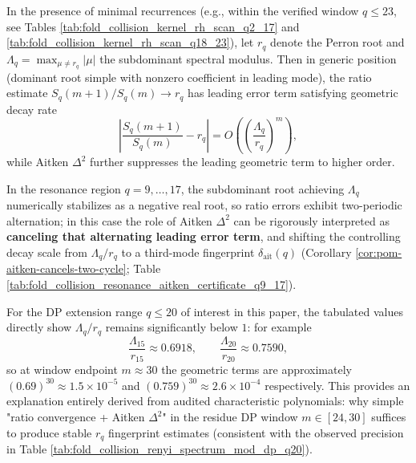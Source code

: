 \begin{remark}\label{rem:pom-dp-window-spectral-gap}
In the presence of minimal recurrences (e.g., within the verified window \(q\le 23\), see Tables \ref{tab:fold_collision_kernel_rh_scan_q2_17} and \ref{tab:fold_collision_kernel_rh_scan_q18_23}), let \(r_q\) denote the Perron root and \(\Lambda_q=\max_{\mu\ne r_q}|\mu|\) the subdominant spectral modulus.
Then in generic position (dominant root simple with nonzero coefficient in leading mode), the ratio estimate \(S_q(m+1)/S_q(m)\to r_q\) has leading error term satisfying geometric decay rate
\[
\left|\frac{S_q(m+1)}{S_q(m)}-r_q\right|=O\!\left(\left(\frac{\Lambda_q}{r_q}\right)^{m}\right),
\]
while Aitken \(\Delta^2\) further suppresses the leading geometric term to higher order.
\par
In the resonance region \(q=9,\dots,17\), the subdominant root achieving \(\Lambda_q\) numerically stabilizes as a negative real root, so ratio errors exhibit two-periodic alternation; in this case the role of Aitken \(\Delta^2\) can be rigorously interpreted as \textbf{canceling that alternating leading error term}, and shifting the controlling decay scale from \(\Lambda_q/r_q\) to a third-mode fingerprint \(\delta_{\mathrm{ait}}(q)\) (Corollary \ref{cor:pom-aitken-cancels-two-cycle}; Table \ref{tab:fold_collision_resonance_aitken_certificate_q9_17}).
\par
For the DP extension range \(q\le 20\) of interest in this paper, the tabulated values directly show \(\Lambda_q/r_q\) remains significantly below \(1\): for example
\[
\frac{\Lambda_{15}}{r_{15}}\approx 0.6918,\qquad
\frac{\Lambda_{20}}{r_{20}}\approx 0.7590,
\]
so at window endpoint \(m\approx 30\) the geometric terms are approximately \((0.69)^{30}\approx 1.5\times 10^{-5}\) and \((0.759)^{30}\approx 2.6\times 10^{-4}\) respectively.
This provides an explanation entirely derived from audited characteristic polynomials: why simple "ratio convergence + Aitken \(\Delta^2\)" in the residue DP window \(m\in[24,30]\) suffices to produce stable \(r_q\) fingerprint estimates (consistent with the observed precision in Table \ref{tab:fold_collision_renyi_spectrum_mod_dp_q20}).
\end{remark}


